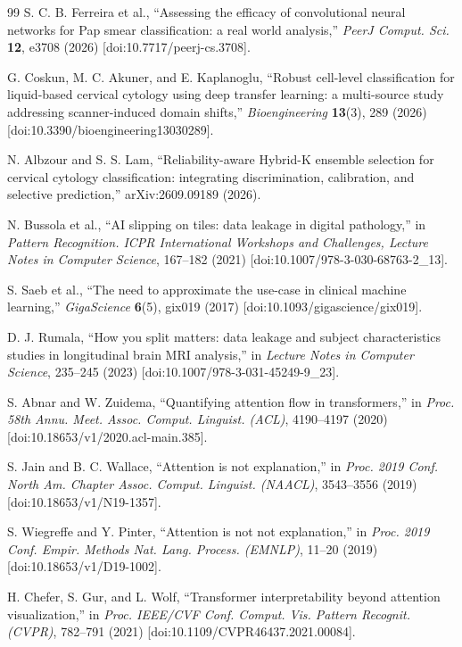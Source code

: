 \documentclass[12pt,letterpaper]{article}
\begin{document}
{\begin{thebibliography}{99}
S. C. B. Ferreira et al., ``Assessing the efficacy of convolutional neural networks for Pap smear classification: a real world analysis,'' \textit{PeerJ Comput. Sci.} \textbf{12}, e3708 (2026) [doi:10.7717/peerj-cs.3708].

G. Coskun, M. C. Akuner, and E. Kaplanoglu, ``Robust cell-level classification for liquid-based cervical cytology using deep transfer learning: a multi-source study addressing scanner-induced domain shifts,'' \textit{Bioengineering} \textbf{13}(3), 289 (2026) [doi:10.3390/bioengineering13030289].

N. Albzour and S. S. Lam, ``Reliability-aware Hybrid-K ensemble selection for cervical cytology classification: integrating discrimination, calibration, and selective prediction,'' arXiv:2609.09189 (2026).

N. Bussola et al., ``AI slipping on tiles: data leakage in digital pathology,'' in \textit{Pattern Recognition. ICPR International Workshops and Challenges, Lecture Notes in Computer Science}, 167--182 (2021) [doi:10.1007/978-3-030-68763-2\_13].

S. Saeb et al., ``The need to approximate the use-case in clinical machine learning,'' \textit{GigaScience} \textbf{6}(5), gix019 (2017) [doi:10.1093/gigascience/gix019].

D. J. Rumala, ``How you split matters: data leakage and subject characteristics studies in longitudinal brain MRI analysis,'' in \textit{Lecture Notes in Computer Science}, 235--245 (2023) [doi:10.1007/978-3-031-45249-9\_23].

S. Abnar and W. Zuidema, ``Quantifying attention flow in transformers,'' in \textit{Proc. 58th Annu. Meet. Assoc. Comput. Linguist. (ACL)}, 4190--4197 (2020) [doi:10.18653/v1/2020.acl-main.385].

S. Jain and B. C. Wallace, ``Attention is not explanation,'' in \textit{Proc. 2019 Conf. North Am. Chapter Assoc. Comput. Linguist. (NAACL)}, 3543--3556 (2019) [doi:10.18653/v1/N19-1357].

S. Wiegreffe and Y. Pinter, ``Attention is not not explanation,'' in \textit{Proc. 2019 Conf. Empir. Methods Nat. Lang. Process. (EMNLP)}, 11--20 (2019) [doi:10.18653/v1/D19-1002].

H. Chefer, S. Gur, and L. Wolf, ``Transformer interpretability beyond attention visualization,'' in \textit{Proc. IEEE/CVF Conf. Comput. Vis. Pattern Recognit. (CVPR)}, 782--791 (2021) [doi:10.1109/CVPR46437.2021.00084].


\end{thebibliography}}
\end{document}
